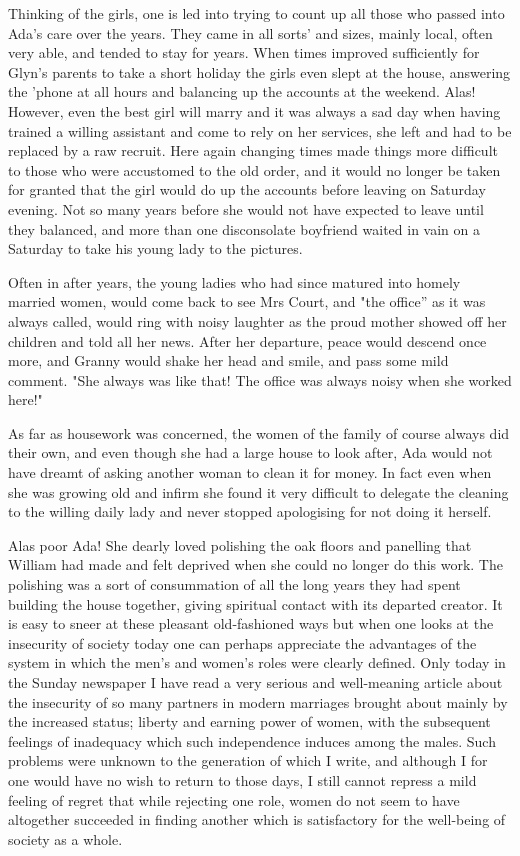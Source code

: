 Thinking of the girls, one is led into trying to count up all those who passed into Ada’s care over the years. They came in all sorts' and sizes, mainly local, often very able, and tended to stay for years. When times improved sufficiently for Glyn's parents to take a short holiday the girls even slept at the house, answering the 'phone at all hours and balancing up the accounts at the weekend. Alas! However, even the best girl will marry and it was always a sad day when having trained a willing assistant and come to rely on her services, she left and had to be replaced by a raw recruit. Here again changing times made things more difficult to those who were accustomed to the old order, and it would no longer be taken for granted that the girl would do up the accounts before leaving on Saturday evening. Not so many years before she would not have expected to leave until they balanced, and more than one disconsolate boyfriend waited in vain on a Saturday to take his young lady to the pictures.

Often in after years, the young ladies who had since matured into homely married women, would come back to see Mrs Court, and "the office” as it was always called, would ring with noisy laughter as the proud mother showed off her children and told all her news. After her departure, peace would descend once more, and Granny would shake her head and smile, and pass some mild comment. "She always was like that! The office was always noisy when she worked here!"

As far as housework was concerned, the women of the family of course always did their own, and even though she had a large house to look after, Ada would not have dreamt of asking another woman to clean it for money. In fact even when she was growing old and infirm she found it very difficult to delegate the cleaning to the willing daily lady and never stopped apologising for not doing it herself.

Alas poor Ada! She dearly loved polishing the oak floors and panelling that William had made and felt deprived when she could no longer do this work. The polishing was a sort of consummation of all the long years they had spent building the house together, giving spiritual contact with its departed creator. It is easy to sneer at these pleasant old-fashioned ways but when one looks at the insecurity of society today one can perhaps appreciate the advantages of the system in which the men's and women's roles were clearly defined. Only today in the Sunday newspaper I have read a very serious and well-meaning article about the insecurity of so many partners in modern marriages brought about mainly by the increased status; liberty and earning power of women, with the subsequent feelings of inadequacy which such independence induces among the males. Such problems were unknown to the generation of which I write, and although I for one would have no wish to return to those days, I still cannot repress a mild feeling of regret that while rejecting one role, women do not seem to have altogether succeeded in finding another which is satisfactory for the well-being of society as a whole.

